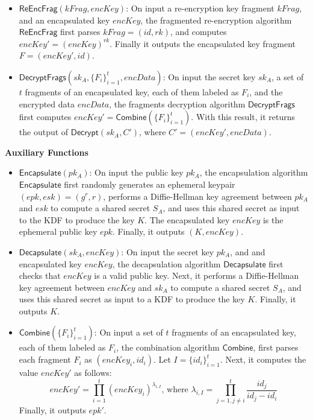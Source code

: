 \documentclass{amsart}
\begin{document}
\begin{itemize}
	\item $\mathsf{ReEncFrag}(kFrag, encKey)$: On input a re-encryption key fragment $kFrag$, and an encapsulated key $encKey$, the fragmented re-encryption algorithm $\mathsf{ReEncFrag}$ first parses $kFrag = (id, rk)$, 
	and computes $encKey' = (encKey)^{rk}$. Finally it outputs the encapsulated key fragment $F = (encKey', id)$. 
		
		\item $\mathsf{DecryptFrags}(sk_A, \{F_i\}_{i=1}^t, encData)$: On input the secret key $sk_A$, a set of $t$ fragments of an encapsulated key, each of them labeled as $F_i$, and the encrypted data $encData$, the fragments decryption algorithm $\mathsf{DecryptFrags}$ first computes $encKey' = \mathsf{Combine}(\{F_i\}_{i=1}^t)$. With this result, it returns the output of $\mathsf{Decrypt}(sk_A, C')$, where $C' = (encKey', encData)$.
\end{itemize}
	


\textbf{Auxiliary Functions}
\begin{itemize}
	\item $\mathsf{Encapsulate}(pk_A)$: On input the public key $pk_A$, %
	the encapsulation algorithm $\mathsf{Encapsulate}$ first randomly generates an ephemeral keypair $(epk, esk) = (g^r, r)$, performs a Diffie-Hellman key agreement between $pk_A$ and $esk$ to compute a shared secret $S_A$, and uses this shared secret as input to the KDF to produce the key $K$. The encapsulated key $encKey$ is the ephemeral public key $epk$. Finally, it outputs $(K, encKey)$.
	\item $\mathsf{Decapsulate}(sk_A, encKey)$: On input the secret key $pk_A$, and and encapsulated key $encKey$, the decapsulation algorithm $\mathsf{Decapsulate}$ first checks that $encKey$ is a valid public key. 
	Next, it performs a Diffie-Hellman key agreement between $encKey$ and $sk_A$ to compute a shared secret $S_A$, and uses this shared secret as input to a KDF to produce the key $K$. Finally, it outputs $K$.
	\item $\mathsf{Combine}(\{F_i\}_{i=1}^t)$: On input a set of $t$ fragments of an encapsulated key, each of them labeled as $F_i$, the combination algorithm $\mathsf{Combine}$, first parses each fragment $F_i$ as $(encKey_i, id_i)$. %
Let $I = \{id_i\}_{i=1}^t$. Next, it computes the value $encKey'$ as follows:
$$encKey' = \prod\limits_{i=1}^{t} (encKey_i)^{\lambda_{i, I}}
\text{, where } \lambda_{i, I} = \prod\limits_{j=1, j\neq i}^{t} \frac{id_j}{id_j-id_i}$$
Finally, it outputs $epk'$.
\end{itemize}
\end{document}
